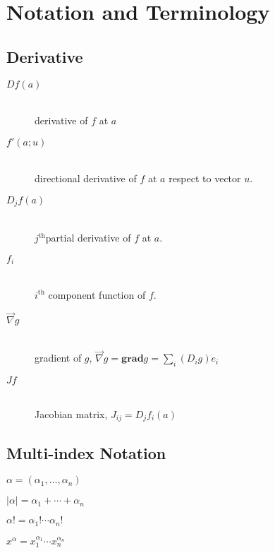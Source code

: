 \section{Notation and Terminology}

\subsection{Derivative}

\begin{description}
	\item[$Df(a)$] \hfill \\
		derivative of $f$ at $a$
		
	\item[$f'(a;u)$] \hfill \\
		directional derivative of $f$ at $a$ respect to vector $u$.
		
	\item[$D_jf(a)$] \hfill \\
		$j^\textrm{th}$partial derivative of $f$ at $a$.

	\item[$f_i$] \hfill \\
		$i^\textrm{th}$ component function of $f$.

	\item[$\vec\nabla g$] \hfill \\
		gradient of $g$, $\vec\nabla g = \mathbf{grad} g = \sum_i (D_ig)e_i$

	\item[$J f$] \hfill \\
		Jacobian matrix, $J_{ij} = D_jf_i(a)$
\end{description}

\subsection{Multi-index Notation}

	$\alpha = (\alpha_1, \ldots, \alpha_n)$
	
	$|\alpha| = \alpha_1 + \cdots + \alpha_n$
	
	$\alpha! = \alpha_1! \cdots \alpha_n!$
	
	$x^\alpha = x_1^{\alpha_1} \cdots x_n^{\alpha_n}$